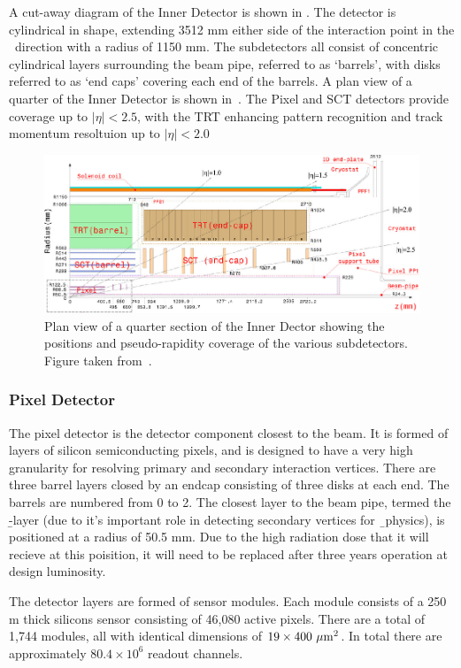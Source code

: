 A cut-away diagram of the Inner Detector is shown in . The detector
is cylindrical in shape, extending 3512 mm either side of the interaction point
in the \z\ direction with a radius of 1150 mm. The subdetectors all consist of
concentric cylindrical layers surrounding the beam pipe, referred to as
`barrels', with disks referred to as `end caps' covering each end of the
barrels. A plan view of a quarter of the Inner Detector is shown
in~. The Pixel and SCT detectors provide coverage up to $|\eta|<2.5$,
with the TRT enhancing pattern recognition and track momentum resoltuion up to
$|\eta|<2.0$

\begin{figure}[h]
\centering
\includegraphics[width=\textwidth]{FigID26-mod-011107_crop}
\caption{Plan view of a quarter section of the Inner Dector showing the
positions and pseudo-rapidity coverage of the various subdetectors. Figure taken from~\cite{Aad:1125884}.}
\label{fig:id-plan}
\end{figure}

\subsubsection{Pixel Detector}

The pixel detector is the detector component closest to the beam. It is formed
of layers of silicon semiconducting pixels, and is designed to have a very
high granularity for resolving primary and secondary interaction vertices. There
are three barrel layers closed by an endcap consisting of three disks at each
end. The barrels are numbered from 0 to 2. The closest layer to the beam
pipe, termed the \b-layer (due to it's important role in detecting secondary
vertices for \b\ physics), is
positioned at a radius of 50.5 mm. Due to the high radiation dose that it will
recieve at this poisition, it will need to be replaced after three years
operation at design luminosity.

The detector layers are formed of sensor modules. Each module consists of a 250 \micro m thick
silicons sensor consisting of 46,080 active pixels. There are a total of 1,744
modules, all with identical dimensions of $19\times400~\mu \rm{m}^{2}$. In total
there are approximately $80.4\times 10^{6}$ readout channels.

